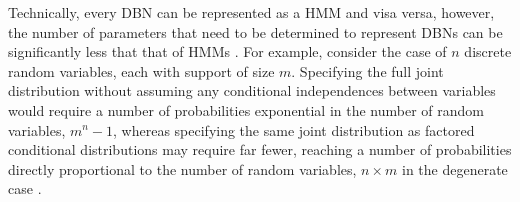 Technically, every DBN can be represented as a HMM and visa versa, however, the number of parameters that need to be determined to represent DBNs can be significantly less that that of HMMs \cite{KollerPGM}. For example, consider the case of $n$ discrete random variables, each with support of size $m$. Specifying the full joint distribution without assuming any conditional independences between variables would require a number of probabilities exponential in the number of random variables, $m^{n}-1$, whereas specifying the same joint distribution as factored conditional distributions may require far fewer, reaching a number of probabilities directly proportional to the number of random variables, $n \times m$ in the degenerate case \cite[p.~63]{KollerPGM}. 

